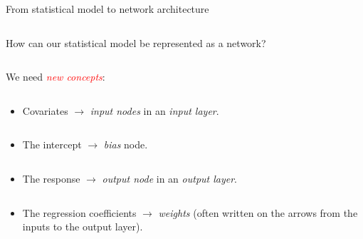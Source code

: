 \documentclass[10pt,ignorenonframetext,]{beamer}
\providecommand{\tightlist}{%
  \setlength{\itemsep}{0pt}\setlength{\parskip}{0pt}}
\begin{document}
\begin{frame}

\begin{block}{From statistical model to network architecture}

\(~\)

How can our statistical model be represented as a network?

\(~\)

We need \emph{\textcolor{red}{new concepts}}:

\(~\)

\begin{itemize}
\tightlist
\item
  Covariates \(\rightarrow\) \emph{input nodes} in an \emph{input
  layer}.
\end{itemize}

\(~\)

\begin{itemize}
\tightlist
\item
  The intercept \(\rightarrow\) \emph{bias} node.
\end{itemize}

\(~\)

\begin{itemize}
\tightlist
\item
  The response \(\rightarrow\) \emph{output node} in an \emph{output
  layer}.
\end{itemize}

\(~\)

\begin{itemize}
\tightlist
\item
  The regression coefficients \(\rightarrow\) \emph{weights} (often
  written on the arrows from the inputs to the output layer).
\end{itemize}

\end{block}

\end{frame}
\end{document}
